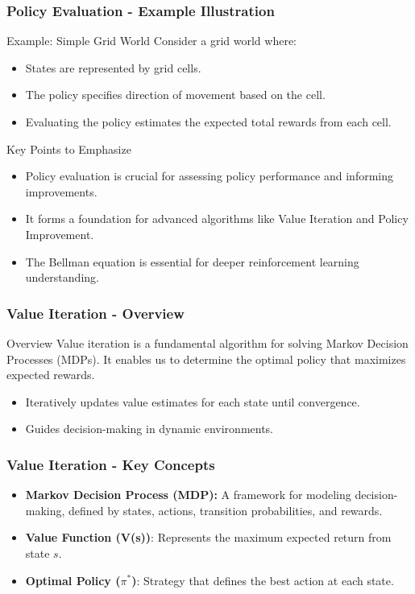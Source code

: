 \documentclass[aspectratio=169]{beamer}
\begin{document}
\begin{frame}[fragile]
    \frametitle{Policy Evaluation - Example Illustration}
    \begin{block}{Example: Simple Grid World}
        Consider a grid world where:
        \begin{itemize}
            \item States are represented by grid cells.
            \item The policy specifies direction of movement based on the cell.
            \item Evaluating the policy estimates the expected total rewards from each cell.
        \end{itemize}
    \end{block}
    
    \begin{block}{Key Points to Emphasize}
        \begin{itemize}
            \item Policy evaluation is crucial for assessing policy performance and informing improvements.
            \item It forms a foundation for advanced algorithms like Value Iteration and Policy Improvement.
            \item The Bellman equation is essential for deeper reinforcement learning understanding.
        \end{itemize}
    \end{block}
\end{frame}

\begin{frame}[fragile]
    \frametitle{Value Iteration - Overview}
    \begin{block}{Overview}
        Value iteration is a fundamental algorithm for solving Markov Decision Processes (MDPs). It enables us to determine the optimal policy that maximizes expected rewards.
    \end{block}
    \begin{itemize}
        \item Iteratively updates value estimates for each state until convergence.
        \item Guides decision-making in dynamic environments.
    \end{itemize}
\end{frame}

\begin{frame}[fragile]
    \frametitle{Value Iteration - Key Concepts}
    \begin{itemize}
        \item \textbf{Markov Decision Process (MDP):} A framework for modeling decision-making, defined by states, actions, transition probabilities, and rewards.
        \item \textbf{Value Function (V(s))}: Represents the maximum expected return from state \( s \).
        \item \textbf{Optimal Policy (\(\pi^*\))}: Strategy that defines the best action at each state.
    \end{itemize}
\end{frame}
\end{document}
